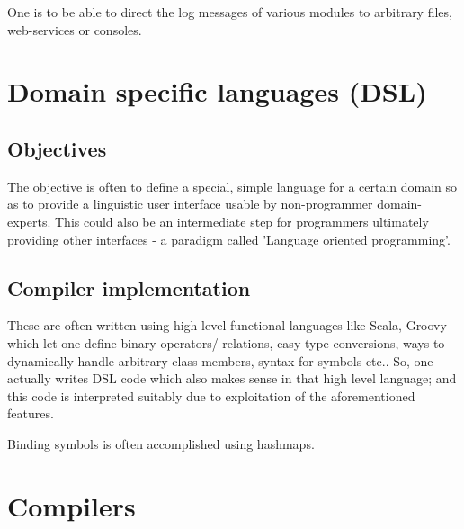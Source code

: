 \documentclass[oneside, article]{memoir}
\begin{document}
One is to be able to direct the log messages of various modules to arbitrary files, web-services or consoles.

\chapter{Domain specific languages (DSL)}
\section{Objectives}
The objective is often to define a special, simple language for a certain domain so as to provide a linguistic user interface usable by non-programmer domain-experts. This could also be an intermediate step for programmers ultimately providing other interfaces -  a paradigm called 'Language oriented programming'.

\section{Compiler implementation}
These are often written using high level functional languages like Scala, Groovy which let one define binary operators/ relations, easy type conversions, ways to dynamically handle arbitrary class members, syntax for symbols etc.. So, one actually writes DSL code which also makes sense in that high level language; and this code is interpreted suitably due to exploitation of the aforementioned features.

Binding symbols is often accomplished using hashmaps.

\chapter{Compilers}
\tbc

% 
% 
\end{document}
